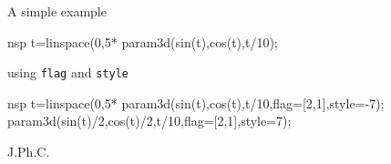 \begin{examples}
\noindent A simple example
\begin{mintednsp}{nsp}
  t=linspace(0,5*%
  param3d(sin(t),cos(t),t/10);
\end{mintednsp}
\noindent using \verb!flag! and \verb!style!

\begin{mintednsp}{nsp}
  t=linspace(0,5*%
  param3d(sin(t),cos(t),t/10,flag=[2,1],style=-7);
  param3d(sin(t)/2,cos(t)/2,t/10,flag=[2,1],style=7);
\end{mintednsp}
\end{examples}

\begin{manseealso}
   
\end{manseealso}


\begin{authors}
  J.Ph.C.

\end{authors}
